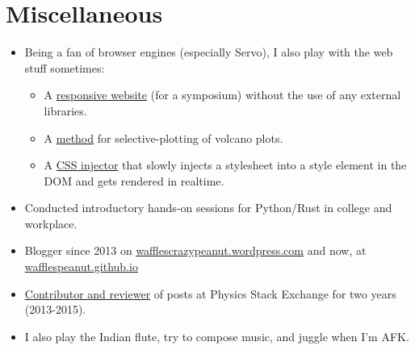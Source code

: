 \documentclass[11pt,a4paper,sans]{moderncv}        %
\newcommand\chref[3][linky]{\href{#2}{\color{#1}#3}}
\begin{document}

\section{Miscellaneous}
\begin{itemize}
\item Being a fan of browser engines (especially Servo), I also play with the web stuff sometimes:
\begin{itemize}
\item A \chref{https://github.com/Wafflespeanut/flight-2016}{responsive website} (for a symposium) without the use of any external libraries.
\item A \chref{https://github.com/Wafflespeanut/volcano-min}{method} for selective-plotting of volcano plots.
\item A \chref{https://github.com/Wafflespeanut/AISH}{CSS injector} that slowly injects a stylesheet into a style element in the DOM and gets rendered in realtime.
\end{itemize}
\item Conducted introductory hands-on sessions for Python/Rust in college and workplace.
\item Blogger since 2013 on \chref{https://wafflescrazypeanut.wordpress.com/}{wafflescrazypeanut.wordpress.com} and now, at \chref{https://wafflespeanut.github.io/}{wafflespeanut.github.io}
\item \chref{https://physics.stackexchange.com/users/11062}{Contributor and reviewer} of posts at Physics Stack Exchange for two years (2013-2015).
\item I also play the Indian flute, try to compose music, and juggle when I'm AFK.
\end{itemize}


\end{document}

